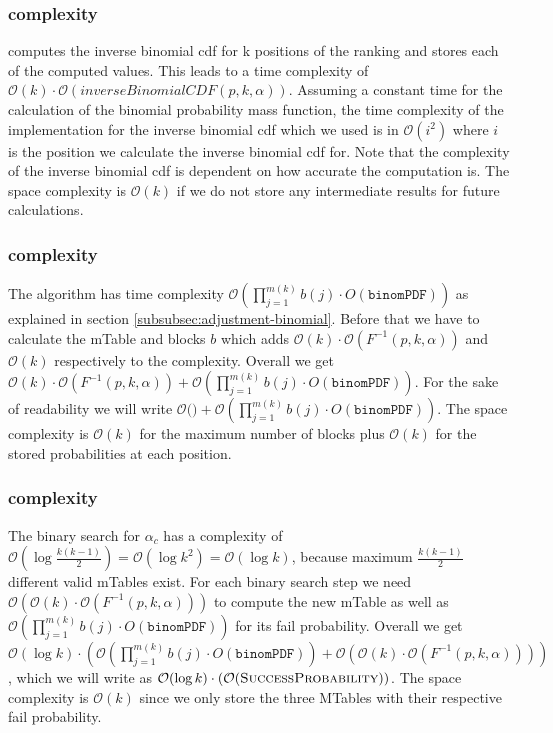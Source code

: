 \subsubsection{\algoMtable complexity}\label{subsubsec:construct-mtable-complexity}
\algoMtable computes the inverse binomial cdf for k positions of the ranking and stores each of the computed values.
%
This leads to a time complexity of $\mathcal{O}(k) \cdot \mathcal{O}(inverseBinomialCDF(p,k,\alpha))$.  Assuming a constant time for the calculation of the binomial probability mass function, the time complexity of the implementation for the inverse binomial cdf which we used is in $\mathcal{O}(i^2)$ where $i$ is the position we calculate the inverse binomial cdf for.
%
Note that the complexity of the inverse binomial cdf is dependent on how accurate the computation is.
%
The space complexity is $\mathcal{O}(k)$ if we do not store any intermediate results for future calculations.
%
\subsubsection{\algoRecursive complexity}\label{subsubsec:success-prob-complexity}
The algorithm \algoRecursive has time complexity $\mathcal{O}(\prod_{j=1}^{m(k)}b(j) \cdot O(\texttt{binomPDF}))$ as explained in section \ref{subsubsec:adjustment-binomial}.
%
Before that we have to calculate the mTable and blocks $b$ which adds $\mathcal{O}(k) \cdot \mathcal{O}(F^{-1}(p,k,\alpha))$ and $\mathcal{O}(k)$ respectively to the complexity.
%
Overall we get $\mathcal{O}(k) \cdot \mathcal{O}(F^{-1}(p,k,\alpha)) + \mathcal{O}(\prod_{j=1}^{m(k)}b(j) \cdot O(\texttt{binomPDF}))$.
%
For the sake of readability we will write $\mathcal{O}($\algoMtable$) + \mathcal{O}(\prod_{j=1}^{m(k)}b(j) \cdot O(\texttt{binomPDF}))$.
%
The space complexity is $\mathcal{O}(k)$ for the maximum number of blocks plus $\mathcal{O}(k)$ for the stored probabilities at each position.
%
\subsubsection{\algoBinomBinary complexity}\label{subsubsec:binom-binary-complexity}
The binary search for $\alpha_c$ has a complexity of $\mathcal{O}(\log{}\frac{k(k-1)}{2}) = \mathcal{O}(\log{}k^2) = \mathcal{O}(\log{}k)$, because maximum $\frac{k(k-1)}{2}$ different valid mTables exist.
%
For each binary search step we need $\mathcal{O}(\mathcal{O}(k) \cdot \mathcal{O}(F^{-1}(p,k,\alpha)))$ to compute the new mTable as well as $\mathcal{O}(\prod_{j=1}^{m(k)}b(j) \cdot O(\texttt{binomPDF}))$ for its fail probability.
%
Overall we get $\mathcal{O}(\log{}k) \cdot (\mathcal{O}(\prod_{j=1}^{m(k)}b(j) \cdot O(\texttt{binomPDF})) + \mathcal{O}(\mathcal{O}(k) \cdot \mathcal{O}(F^{-1}(p,k,\alpha))))$, which we will write as $\mathcal{O}(\log{}k) \cdot (\mathcal{O}(\texttt{{\sc SuccessProbability}}))$.
%
The space complexity is $\mathcal{O}(k)$ since we only store the three MTables with their respective fail probability.